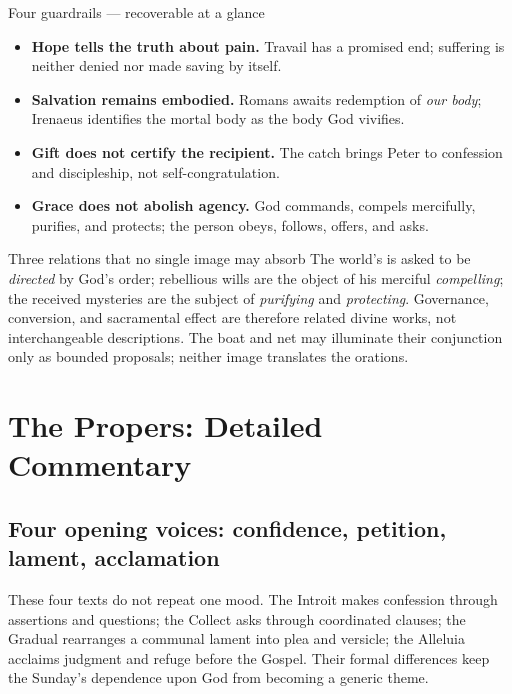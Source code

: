 \begin{deepstudy}
\begin{studybox}{Four guardrails --- recoverable at a glance}
\begin{itemize}[topsep=0pt,itemsep=0.25em,parsep=0pt]
\item \textbf{Hope tells the truth about pain.} Travail has a promised end; suffering is neither denied nor made saving by itself.
\item \textbf{Salvation remains embodied.} Romans awaits redemption of \emph{our body}; Irenaeus identifies the mortal body as the body God vivifies.
\item \textbf{Gift does not certify the recipient.} The catch brings Peter to confession and discipleship, not self-congratulation.
\item \textbf{Grace does not abolish agency.} God commands, compels mercifully, purifies, and protects; the person obeys, follows, offers, and asks.
\end{itemize}
\end{studybox}

\begin{massbox}{Three relations that no single image may absorb}
The world's  is asked to be \emph{directed} by God's order; rebellious wills are the object of his merciful \emph{compelling}; the received mysteries are the subject of \emph{purifying} and \emph{protecting}. Governance, conversion, and sacramental effect are therefore related divine works, not interchangeable descriptions. The boat and net may illuminate their conjunction only as bounded proposals; neither image translates the orations.
\end{massbox}

\newpage
\section*{The Propers: Detailed Commentary}

\subsection*{Four opening voices: confidence, petition, lament, acclamation\enspace{}}

These four texts do not repeat one mood. The Introit makes confession through assertions and questions; the Collect asks through coordinated clauses; the Gradual rearranges a communal lament into plea and versicle; the Alleluia acclaims judgment and refuge before the Gospel. Their formal differences keep the Sunday's dependence upon God from becoming a generic theme.


\end{deepstudy}
